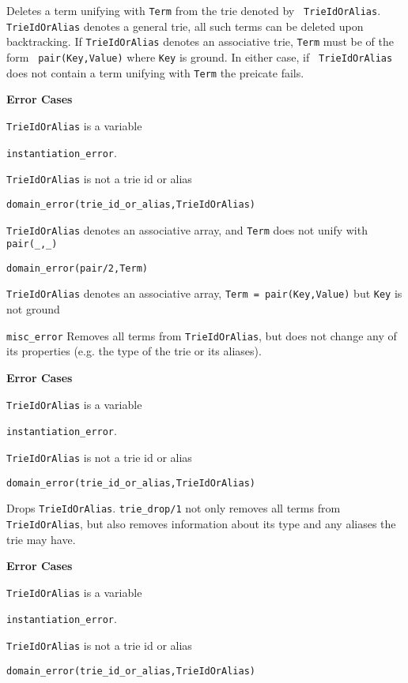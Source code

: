 \begin{description}
%
Deletes a term unifying with {\tt Term} from the trie denoted by {\tt
  TrieIdOrAlias}.  {\tt TrieIdOrAlias} denotes a general trie, all
such terms can be deleted upon backtracking.  If {\tt TrieIdOrAlias}
denotes an associative trie, {\tt Term} must be of the form {\tt
  pair(Key,Value)} where {\tt Key} is ground.  In either case, if {\tt
  TrieIdOrAlias} does not contain a term unifying with {\tt Term} the
preicate fails.

{\bf Error Cases}
\bi
\item 	{\tt TrieIdOrAlias} is a variable
\bi
\item 	{\tt instantiation\_error}.
\ei
\item 	{\tt TrieIdOrAlias} is not a trie id or alias
\bi
\item 	{\tt domain\_error(trie\_id\_or\_alias,TrieIdOrAlias)}
\ei
\item 	{\tt TrieIdOrAlias} denotes an associative array, and {\tt Term} 
  does not unify with {\tt pair(\_,\_)} 
\bi
\item 	{\tt domain\_error(pair/2,Term)}
\ei
\item {\tt TrieIdOrAlias} denotes an associative array, 
  {\tt Term = pair(Key,Value)} but {\tt Key} is not ground 
\bi
\item 	{\tt misc\_error}
\ei
\ei
%
%
Removes all terms from {\tt TrieIdOrAlias}, but does not change any of
its properties (e.g. the type of the trie or its aliases).  

{\bf Error Cases}
\bi
\item 	{\tt TrieIdOrAlias} is a variable
\bi
\item 	{\tt instantiation\_error}.
\ei
\item 	{\tt TrieIdOrAlias} is not a trie id or alias
\bi
\item 	{\tt domain\_error(trie\_id\_or\_alias,TrieIdOrAlias)}
\ei
\ei

%
Drops {\tt TrieIdOrAlias}.  {\tt trie\_drop/1} not only removes all
terms from {\tt TrieIdOrAlias}, but also removes information about its
type and any aliases the trie may have.

{\bf Error Cases}
\bi
\item 	{\tt TrieIdOrAlias} is a variable
\bi
\item 	{\tt instantiation\_error}.
\ei
\item 	{\tt TrieIdOrAlias} is not a trie id or alias
\bi
\item 	{\tt domain\_error(trie\_id\_or\_alias,TrieIdOrAlias)}
\ei
\ei


\end{description}
